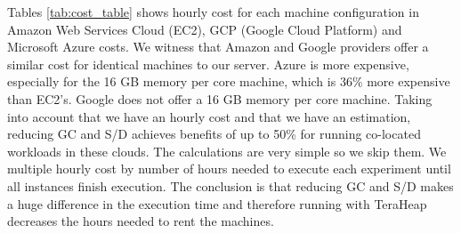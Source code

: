 Tables \ref{tab:cost_table} shows hourly cost for each machine configuration in 
Amazon Web Services Cloud (EC2), GCP (Google Cloud Platform) and Microsoft Azure costs. 
We witness that Amazon and Google providers offer a similar cost for identical machines to our server.
Azure is more expensive, especially for the 16 GB memory per core machine, which is 36\% more expensive than EC2's.
Google does not offer a 16 GB memory per core machine.
Taking into account that we have an hourly cost and that we have an estimation,
reducing GC and S/D achieves benefits of up to 50\% for running co-located workloads in these clouds. The calculations are very simple so we skip them. We multiple hourly cost
by number of hours needed to execute each experiment until all instances finish execution. The conclusion is that reducing GC and S/D makes a huge difference in the execution time and therefore running with TeraHeap decreases the hours needed to rent the machines.

